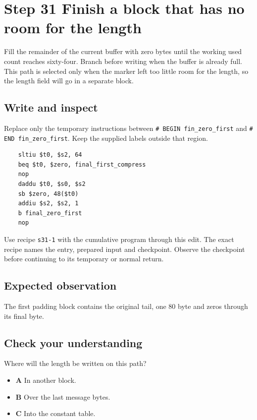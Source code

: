\section{Step 31 Finish a block that has no room for the length}\label{sha-s31}

Fill the remainder of the current buffer with zero bytes until the working used count reaches sixty-four. Branch before writing when the buffer is already full. This path is selected only when the marker left too little room for the length, so the length field will go in a separate block.

\subsection{Write and inspect}
Replace only the temporary instructions between \texttt{\# BEGIN fin\_zero\_first} and \texttt{\# END fin\_zero\_first}. Keep the supplied labels outside that region.

\begin{verbatim}
    sltiu $t0, $s2, 64
    beq $t0, $zero, final_first_compress
    nop
    daddu $t0, $s0, $s2
    sb $zero, 48($t0)
    addiu $s2, $s2, 1
    b final_zero_first
    nop
\end{verbatim}

Use recipe \texttt{s31-1} with the cumulative program through this edit. The exact recipe names the entry, prepared input and checkpoint. Observe the checkpoint before continuing to its temporary or normal return.

\subsection{Expected observation}
The first padding block contains the original tail, one 80 byte and zeros through its final byte.

\subsection{Check your understanding}
Where will the length be written on this path?

\begin{itemize}
  \item \textbf{A} In another block.
  \item \textbf{B} Over the last message bytes.
  \item \textbf{C} Into the constant table.
\end{itemize}
